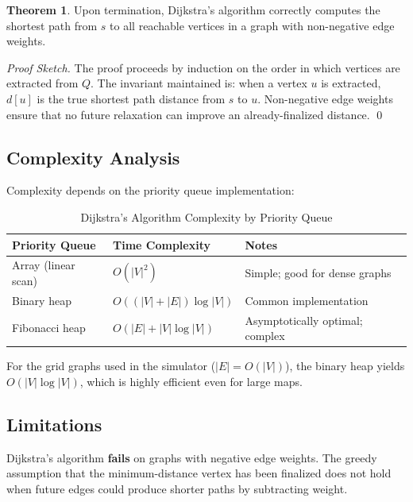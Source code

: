 \documentclass[12pt, a4paper, oneside]{report}
\theoremstyle{definition}
\newtheorem{theorem}{Theorem}[chapter]
\begin{document}
\begin{theorem}
Upon termination, Dijkstra's algorithm correctly computes the shortest path from $s$ to all reachable vertices in a graph with non-negative edge weights.
\end{theorem}

\begin{proof}[Proof Sketch]
The proof proceeds by induction on the order in which vertices are extracted from $Q$. The invariant maintained is: when a vertex $u$ is extracted, $d[u]$ is the true shortest path distance from $s$ to $u$. Non-negative edge weights ensure that no future relaxation can improve an already-finalized distance. \qed
\end{proof}

\subsection{Complexity Analysis}

Complexity depends on the priority queue implementation:

\begin{table}[H]
\centering
\caption{Dijkstra's Algorithm Complexity by Priority Queue}
\label{tab:dijkstra_complexity}
\begin{tabular}{lll}
\toprule
\textbf{Priority Queue} & \textbf{Time Complexity} & \textbf{Notes} \\
\midrule
Array (linear scan)  & $O(|V|^2)$                    & Simple; good for dense graphs \\
Binary heap          & $O((|V| + |E|) \log |V|)$     & Common implementation \\
Fibonacci heap       & $O(|E| + |V| \log |V|)$       & Asymptotically optimal; complex \\
\bottomrule
\end{tabular}
\end{table}

For the grid graphs used in the simulator ($|E| = O(|V|)$), the binary heap yields $O(|V| \log |V|)$, which is highly efficient even for large maps.

\subsection{Limitations}

Dijkstra's algorithm \textbf{fails} on graphs with negative edge weights. The greedy assumption that the minimum-distance vertex has been finalized does not hold when future edges could produce shorter paths by subtracting weight.
\end{document}
